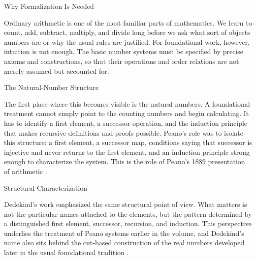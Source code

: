 
\begin{topicbox}{Why Formalization Is Needed}
\begin{exposition}
Ordinary arithmetic is one of the most familiar parts of mathematics. We
learn to count, add, subtract, multiply, and divide long before we ask what
sort of objects numbers are or why the usual rules are justified. For
foundational work, however, intuition is not enough. The basic number systems
must be specified by precise axioms and constructions, so that their
operations and order relations are not merely assumed but accounted for.
\end{exposition}
\end{topicbox}

\begin{topicbox}{The Natural-Number Structure}
\begin{exposition}
The first place where this becomes visible is the natural numbers. A
foundational treatment cannot simply point to the counting numbers and begin
calculating. It has to identify a first element, a successor operation, and
the induction principle that makes recursive definitions and proofs possible.
Peano's role was to isolate this structure: a first element, a successor map,
conditions saying that successor is injective and never returns to the first
element, and an induction principle strong enough to characterize the system.
This is the role of Peano's 1889 presentation of arithmetic
\citep{PeanoArithmeticesPrincipia1889}.
\end{exposition}
\end{topicbox}

\begin{topicbox}{Structural Characterization}
\begin{exposition}
Dedekind's work emphasized the same structural point of view. What matters is
not the particular names attached to the elements, but the pattern determined
by a distinguished first element, successor, recursion, and induction. This
perspective underlies the treatment of Peano systems earlier in the volume,
and Dedekind's name also sits behind the cut-based construction of the real
numbers developed later in the usual foundational tradition
\citep{dedekind1901essays}.
\end{exposition}
\end{topicbox}

